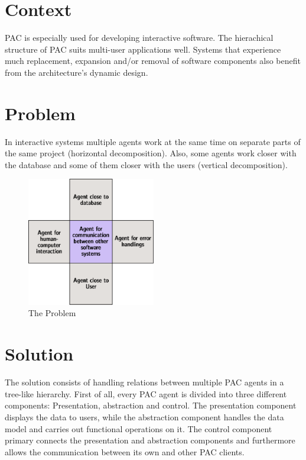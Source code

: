 \documentclass{scrbook}
\begin{document}
\section{Context}	%


PAC is especially used for developing interactive software. The hierachical structure of PAC suits multi-user
applications well. Systems that experience much replacement, expansion and/or removal of software
components also benefit from the architecture's dynamic design.

\section{Problem}

 



In interactive systems multiple agents work at the same time on separate parts of the same project
(horizontal decomposition). Also, some agents work closer with the database and some of them
closer with the users (vertical decomposition).

\begin{figure}
 \centering
 \includegraphics[width=0.5\textwidth]{./pics/problem.eps}
 \caption[Prob]{The Problem\endnotemark[1]}
 \label{abb:prob}
\end{figure}



\section{Solution}		%

The solution consists of handling relations between multiple PAC agents in a tree-like hierarchy. First
of all, every PAC agent is divided into three different components: Presentation, abstraction and
control. The presentation component displays the data to users, while the abstraction component
handles the data model and carries out functional operations on it. The control component primary
connects the presentation and abstraction components and furthermore allows the communication
between its own and other PAC clients.
\end{document}
